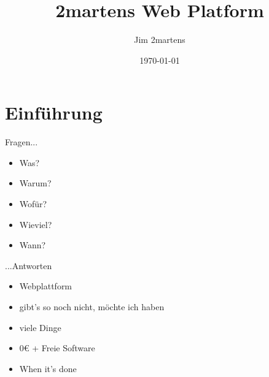 \documentclass{beamer}
\begin{document}
\author{Jim 2martens}
\title{2martens Web Platform}
\date{\today}

\begin{frame}
    \titlepage
\end{frame}

\begin{frame}
    \tableofcontents
\end{frame}

\section{Einführung}
\begin{frame}{Fragen...}
  \begin{itemize}
    \item Was?
    \item Warum?
    \item Wofür?
    \item Wieviel?
    \item Wann?
  \end{itemize}
\end{frame}

\begin{frame}{...Antworten}
  \begin{itemize}
    \item Webplattform
    \item gibt's so noch nicht, möchte ich haben
    \item viele Dinge
    \item 0€ + Freie Software
    \item When it's done
  \end{itemize}
\end{frame}
\end{document}
